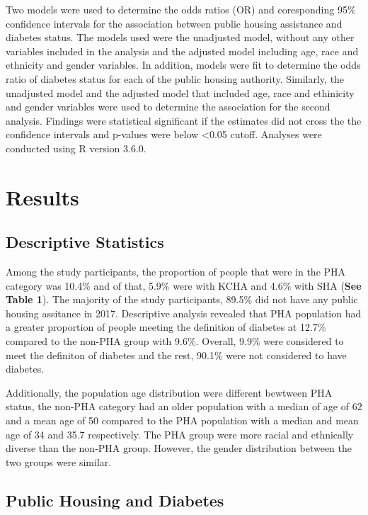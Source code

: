 \documentclass [11pt, proquest] {uwthesis}[2015/03/03]
\begin{document}
Two models were used to determine the odds ratios (OR) and coresponding
95\% confidence intervals for the association between public housing
assistance and diabetes status. The models used were the unadjusted
model, without any other variables included in the analysis and the
adjusted model including age, race and ethnicity and gender variables.
In addition, models were fit to determine the odds ratio of diabetes
status for each of the public housing authority. Similarly, the
unadjusted model and the adjusted model that included age, race and
ethinicity and gender variables were used to determine the association
for the second analysis. Findings were statistical significant if the
estimates did not cross the the confidence intervals and p-values were
below \textless{}0.05 cutoff. Analyses were conducted using R version
3.6.0.

\chapter{Results}\label{ref-labels}

\section{Descriptive Statistics}\label{descriptive-statistics}

Among the study participants, the proportion of people that were in the
PHA category was 10.4\% and of that, 5.9\% were with KCHA and 4.6\% with
SHA (\textbf{See Table 1}). The majority of the study participants,
89.5\% did not have any public housing assitance in 2017. Descriptive
analysis revealed that PHA population had a greater proportion of people
meeting the definition of diabetes at 12.7\% compared to the non-PHA
group with 9.6\%. Overall, 9.9\% were considered to meet the definiton
of diabetes and the rest, 90.1\% were not considered to have diabetes.

Additionally, the population age distribution were different bewtween
PHA status, the non-PHA category had an older population with a median
of age of 62 and a mean age of 50 compared to the PHA population with a
median and mean age of 34 and 35.7 respectively. The PHA group were more
racial and ethnically diverse than the non-PHA group. However, the
gender distribution between the two groups were similar.

\section{Public Housing and Diabetes}\label{public-housing-and-diabetes}
\end{document}
